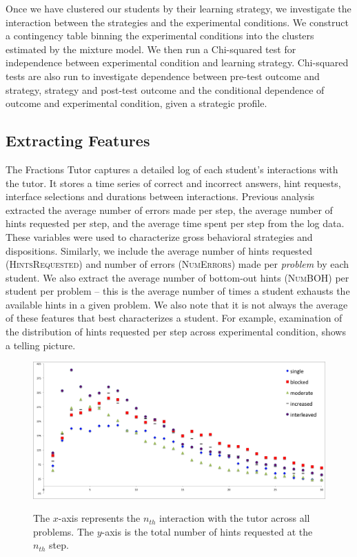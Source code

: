 \documentclass{edm_template}
\newcommand{\ftr}[1]{\textsc{#1}}
\begin{document}
Once we have clustered our students by their learning strategy, we investigate the interaction between the strategies and the experimental conditions. We construct a contingency table binning the experimental conditions into the clusters estimated by the mixture model. We then run a Chi-squared test for independence between experimental condition and learning strategy. Chi-squared tests are also run to investigate dependence between pre-test outcome and strategy, strategy and post-test outcome and the conditional dependence of outcome and experimental condition, given a strategic profile.

\subsection{Extracting Features}
The Fractions Tutor captures a detailed log of each student's interactions with the tutor. It stores a time series of correct and incorrect answers, hint requests, interface selections and durations between interactions. Previous analysis \cite{Rau2012} extracted the average number of errors made per step, the average number of hints requested per step, and the average time spent per step from the log data. These variables were used to characterize gross behavioral strategies and dispositions. Similarly, we include the average number of hints requested (\ftr{HintsRequested}) and number of errors (\ftr{NumErrors}) made per \emph{problem} by each student. We also extract the average number of bottom-out hints (\ftr{NumBOH}) per student per problem -- this is the average number of times a student exhausts the available hints in a given problem. We also note that it is not always the average of these features that best characterizes a student. For example, examination of the distribution of hints requested per step across experimental condition, shows a telling picture.
\begin{figure}[t!]
\centering
\includegraphics[scale=.48]{hintsByStep2.png}\\
\caption{The $x$-axis represents the $n_{th}$ interaction with the tutor across all problems. The $y$-axis is the total number of hints requested at the $n_{th}$ step.}
\label{fig:hints-geom}
\end{figure}
\end{document}
